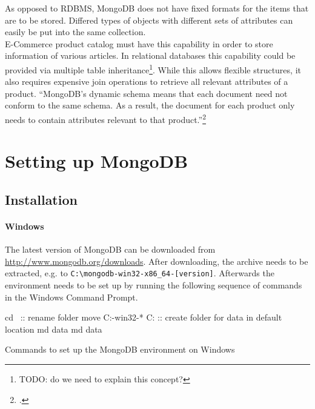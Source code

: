 As opposed to RDBMS, MongoDB does not have fixed formats for the items that
are to be stored. Differed types of objects with different sets of attributes
can easily be put into the same collection. \\
E-Commerce product catalog must have this capability in order to store information
of various articles. In relational databases this capability could be provided
via multiple table inheritance\footnote{TODO: do we need to explain this concept?}.
While this allows flexible structures, it also requires expensive join operations 
to retrieve all relevant attributes of a product.
``MongoDB’s dynamic schema means that each document need not conform to the same
schema. As a result, the document for each product only needs to contain
attributes relevant to that product.''\footcite[][]{mongo_product_catalog}

    
\FloatBarrier
\clearpage
\section{Setting up MongoDB}
\label{sec:setup}

\subsection{Installation}
\label{sec:installation}

\paragraph{Windows}
\label{sec:installation-windows}
The latest version of MongoDB can be downloaded from \url{http://www.mongodb.org/downloads}.
After downloading, the archive needs to be extracted, e.g. to \texttt{C:\textbackslash \-mongo\-db-win32-x86\-\_64-[version]}.
Afterwards the environment needs to be set up by running the following sequence of commands in the
Windows Command Prompt.

\begin{listing}
    \begin{batcode}
cd \
:: rename folder
move C:\mongodb-win32-* C:\mongodb
:: create folder for data in default location
md data
md data\db
    \end{batcode}
    \caption{Commands to set up the MongoDB environment on Windows}
    \label{lst:win-setup}
\end{listing}

